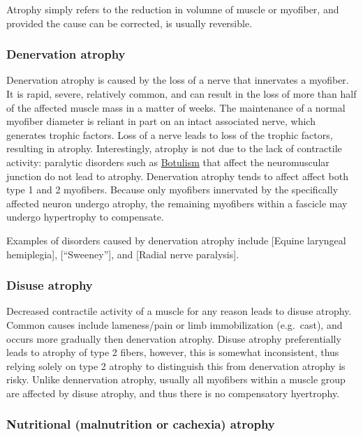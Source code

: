 \documentclass[openany]{book}
\begin{document}
Atrophy simply refers to the reduction in volumne of muscle or myofiber,
and provided the cause can be corrected, is usually reversible.

\subsubsection{Denervation atrophy}\label{denervation-atrophy}

Denervation atrophy is caused by the loss of a nerve that innervates a
myofiber. It is rapid, severe, relatively common, and can result in the
loss of more than half of the affected muscle mass in a matter of weeks.
The maintenance of a normal myofiber diameter is reliant in part on an
intact associated nerve, which generates trophic factors. Loss of a
nerve leads to loss of the trophic factors, resulting in atrophy.
Interestingly, atrophy is not due to the lack of contractile activity:
paralytic disorders such as \protect\hyperlink{botulism}{Botulism} that
affect the neuromuscular junction do not lead to atrophy. Denervation
atrophy tends to affect affect both type 1 and 2 myofibers. Because only
myofibers innervated by the specifically affected neuron undergo
atrophy, the remaining myofibers within a fascicle may undergo
hypertrophy to compensate.

Examples of disorders caused by denervation atrophy include {[}Equine
laryngeal hemiplegia{]}, {[}``Sweeney''{]}, and {[}Radial nerve
paralysis{]}.

\subsubsection{Disuse atrophy}\label{disuse-atrophy}

Decreased contractile activity of a muscle for any reason leads to
disuse atrophy. Common causes include lameness/pain or limb
immobilization (e.g.~cast), and occurs more gradually then denervation
atrophy. Disuse atrophy preferentially leads to atrophy of type 2
fibers, however, this is somewhat inconsistent, thus relying solely on
type 2 atrophy to distinguish this from denervation atrophy is risky.
Unlike dennervation atrophy, usually all myofibers within a muscle group
are affected by disuse atrophy, and thus there is no compensatory
hyertrophy.

\subsubsection{Nutritional (malnutrition or cachexia)
atrophy}\label{nutritional-malnutrition-or-cachexia-atrophy}
\end{document}
